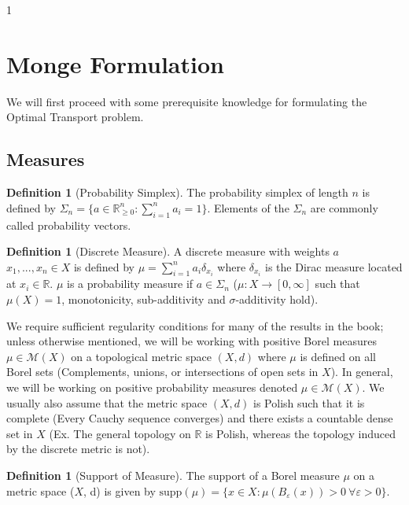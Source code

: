 \documentclass[12pt]{article}
\theoremstyle{definition}
\newtheorem{definition}[theorem]{Definition}
\theoremstyle{plain}
\begin{document}
\begin{spacing}{1}

\section{Monge Formulation}

We will first proceed with some prerequisite knowledge for formulating the Optimal Transport problem.

\subsection{Measures}
\begin{definition}[Probability Simplex]
    The probability simplex of length $n$ is defined by $\Sigma_n = \{a \in \mathbb{R}^n_{\geq 0}: \sum_{i = 1}^n a_i = 1\}$.
    \newline
    Elements of the $\Sigma_n$ are commonly called probability vectors.
\end{definition}

\begin{definition}[Discrete Measure]
A discrete measure with weights $a$ $x_1, ..., x_n \in X$ is defined by $\mu = \sum_{i = 1}^n a_i \delta_{x_i}$ where $\delta_{x_i}$ is the Dirac measure located at $x_i \in \mathbb{R}$.
\newline
$\mu$ is a probability measure if $a \in \Sigma_n$ ($\mu: X \rightarrow [0, \infty]$ such that $\mu(X) = 1$, monotonicity, sub-additivity and $\sigma$-additivity hold).
\end{definition}

We require sufficient regularity conditions for many of the results in the book; unless otherwise mentioned, we will be working with positive Borel measures $\mu \in \mathcal{M}(X)$ on a topological metric space $(X, d)$ where $\mu$ is defined on all Borel sets (Complements, unions, or intersections of open sets in $X$). In general, we will be working on positive probability measures denoted $\mu \in \mathcal{M}(X)$. We usually also assume that the metric space $(X, d)$ is Polish such that it is complete (Every Cauchy sequence converges) and there exists a countable dense set in $X$ (Ex. The general topology on $\mathbb{R}$ is Polish, whereas the topology induced by the discrete metric is not).

\begin{definition}[Support of Measure]
    The support of a Borel measure $\mu$ on a metric space ($X$, d) is given by $\text{supp}(\mu) = \{x \in X: \mu(B_{\varepsilon}(x)) > 0 \ \forall \varepsilon > 0\}$.
\end{definition}


\end{spacing}
\end{document}
